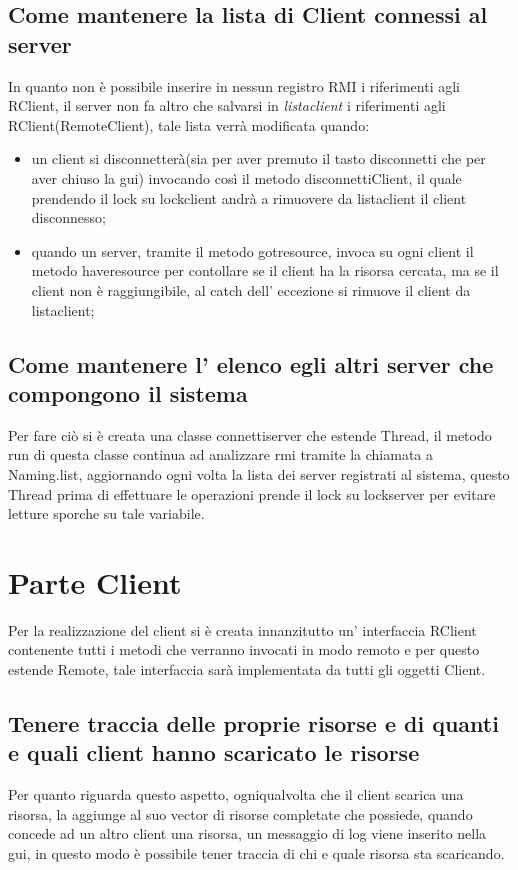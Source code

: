 \documentclass[12pt]{article}
\begin{document}
\subsection{Come mantenere la lista di Client connessi al server}
In quanto non è possibile inserire in nessun registro RMI i riferimenti agli RClient, il server non fa altro che salvarsi in \textit{listaclient} i riferimenti agli RClient(RemoteClient), tale lista verrà modificata quando:
\begin{itemize}
	\item un client si disconnetterà(sia per aver premuto il tasto disconnetti che per aver chiuso la gui) invocando così il metodo disconnettiClient, il quale prendendo il lock su lockclient andrà a rimuovere da listaclient il client disconnesso;
	\item quando un server, tramite il metodo gotresource, invoca su ogni client il metodo haveresource per contollare se il client ha la risorsa cercata, ma se il client non è raggiungibile, al catch dell' eccezione si rimuove il client da listaclient;
\end{itemize}
\subsection{Come mantenere l' elenco egli altri server che compongono il sistema}
Per fare ciò si è creata una classe connettiserver che estende Thread, il metodo run di questa classe continua ad analizzare rmi tramite la chiamata a Naming.list, aggiornando ogni volta la lista dei server registrati al sistema, questo Thread prima di effettuare le operazioni prende il lock su lockserver per evitare letture sporche su tale variabile. 
\section{Parte Client}
Per la realizzazione del client si è creata innanzitutto un' interfaccia RClient contenente tutti i metodi che verranno invocati in modo remoto e per questo estende Remote, tale interfaccia sarà implementata da tutti gli oggetti Client.
\subsection{Tenere traccia delle proprie risorse e di quanti e quali client hanno scaricato le risorse}
Per quanto riguarda questo aspetto, ogniqualvolta che il client scarica una risorsa, la aggiunge al suo vector di risorse completate che possiede, quando concede ad un altro client una risorsa,  un messaggio di log viene inserito nella gui, in questo modo è possibile tener traccia di chi e quale risorsa sta scaricando.
\end{document}
